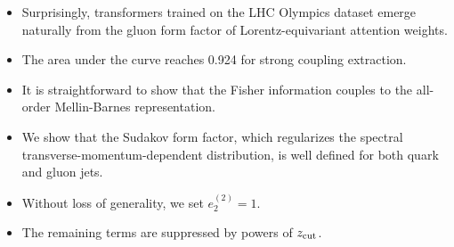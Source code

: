 \begin{itemize}
  \item Surprisingly, transformers trained on the LHC Olympics dataset emerge naturally from the gluon form factor of Lorentz-equivariant attention weights.
  \item The area under the curve reaches 0.924 for strong coupling extraction.
  \item It is straightforward to show that the Fisher information couples to the all-order Mellin-Barnes representation.
\end{itemize}

\begin{itemize}
  \item We show that the Sudakov form factor, which regularizes the spectral transverse-momentum-dependent distribution, is well defined for both quark and gluon jets.
  \item Without loss of generality, we set $e_2^{(2)} = 1$.
  \item The remaining terms are suppressed by powers of $z_{\rm cut}$.
\end{itemize}

